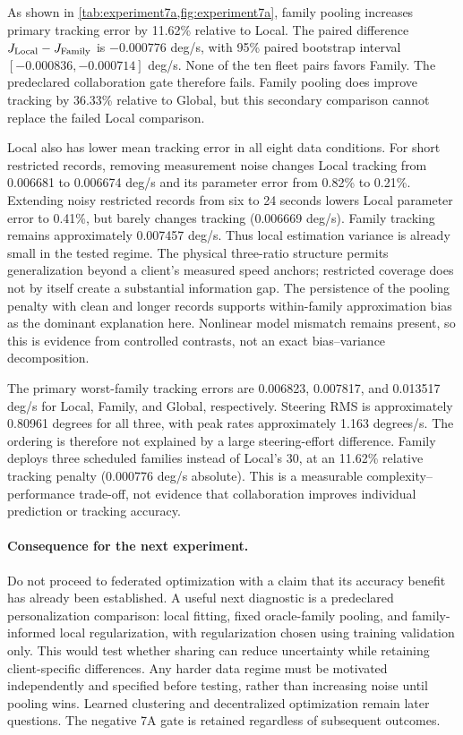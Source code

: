 As shown in \cref{tab:experiment7a,fig:experiment7a}, family pooling increases
primary tracking error by 11.62\% relative to Local. The paired difference
$J_{\rm Local}-J_{\rm Family}$ is $-0.000776$ deg/s, with 95\% paired bootstrap
interval $[-0.000836,-0.000714]$ deg/s. None of the ten fleet pairs favors
Family. The predeclared collaboration gate therefore fails. Family pooling
does improve tracking by 36.33\% relative to Global, but this secondary
comparison cannot replace the failed Local comparison.

Local also has lower mean tracking error in all eight data conditions.
For short restricted records, removing measurement noise changes Local
tracking from 0.006681 to 0.006674 deg/s and its parameter error from 0.82\%
to 0.21\%. Extending noisy restricted records from six to 24 seconds lowers
Local parameter error to 0.41\%, but barely changes tracking (0.006669 deg/s).
Family tracking remains approximately 0.007457 deg/s. Thus local estimation
variance is already small in the tested regime. The physical three-ratio
structure permits generalization beyond a client's measured speed anchors;
restricted coverage does not by itself create a substantial information gap.
The persistence of the pooling penalty with clean and longer records supports
within-family approximation bias as the dominant explanation here. Nonlinear
model mismatch remains present, so this is evidence from controlled contrasts,
not an exact bias--variance decomposition.

The primary worst-family tracking errors are 0.006823, 0.007817, and 0.013517
deg/s for Local, Family, and Global, respectively. Steering RMS is approximately
0.80961 degrees for all three, with peak rates approximately 1.163 degrees/s.
The ordering is therefore not explained by a large steering-effort difference.
Family deploys three scheduled families instead of Local's 30, at an 11.62\%
relative tracking penalty (0.000776 deg/s absolute). This is a measurable
complexity--performance trade-off, not evidence that collaboration improves
individual prediction or tracking accuracy.

\paragraph{Consequence for the next experiment.}
Do not proceed to federated optimization with a claim that its accuracy benefit
has already been established. A useful next diagnostic is a predeclared
personalization comparison: local fitting, fixed oracle-family pooling, and
family-informed local regularization, with regularization chosen using training
validation only. This would test whether sharing can reduce uncertainty while
retaining client-specific differences. Any harder data regime must be motivated
independently and specified before testing, rather than increasing noise until
pooling wins. Learned clustering and decentralized optimization remain later
questions. The negative 7A gate is retained regardless of subsequent outcomes.

